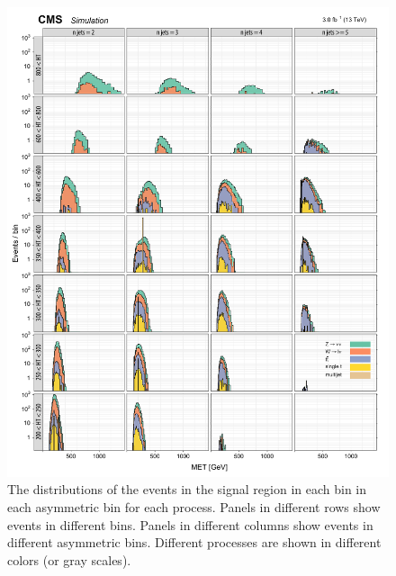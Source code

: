 \begin{figure}[!h]
\centering
\includegraphics[scale=0.95]{figures/kiplots/c150107_s150318_f015_MET_40}
\caption{The \met distributions of the events in the signal region in
each \scalht bin in each asymmetric \njet bin for each process. Panels
in different rows show events in different \scalht bins. Panels in
different columns show events in different asymmetric \njet bins.
Different processes are shown in different colors (or gray scales).}
\label{c150107_s150318_f015_MET_40}
\end{figure}

